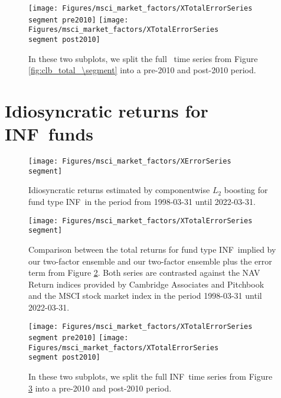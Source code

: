 \begin{figure}[H]
	\centering
	\texttt{[image: Figures/msci\_market\_factors/XTotalErrorSeries\\segment pre2010]}
	\texttt{[image: Figures/msci\_market\_factors/XTotalErrorSeries\\segment post2010]}
	\caption{
		In these two subplots, we split the full \segment \ time series from Figure \ref{fig:clb_total_\segment} into a pre-2010 and post-2010 period.
	}
	\label{fig:clb_pre_post_2010_\segment}
\end{figure}


\renewcommand{\segment}{INF}

\section{Idiosyncratic returns for \segment \ funds}
\label{sec:errors_\segment}

\begin{figure}[H]
	\centering
	\texttt{[image: Figures/msci\_market\_factors/XErrorSeries\\segment]}
	\caption{Idiosyncratic returns estimated by componentwise $L_2$ boosting for fund type \segment \ in the period from 1998-03-31 until 2022-03-31.}
	\label{fig:clb_idio_\segment}
\end{figure}

\begin{figure}[H]
	\centering
	\texttt{[image: Figures/msci\_market\_factors/XTotalErrorSeries\\segment]}
	\caption{
		Comparison between the total returns for fund type \segment \ implied by our two-factor ensemble and our two-factor ensemble plus the error term from Figure \ref{fig:clb_idio_\segment}.
		Both series are contrasted against the NAV Return indices provided by Cambridge Associates and Pitchbook and the MSCI stock market index in the period 1998-03-31 until 2022-03-31.
	}
	\label{fig:clb_total_\segment}
\end{figure}

\begin{figure}[H]
	\centering
	\texttt{[image: Figures/msci\_market\_factors/XTotalErrorSeries\\segment pre2010]}
	\texttt{[image: Figures/msci\_market\_factors/XTotalErrorSeries\\segment post2010]}
	\caption{
		In these two subplots, we split the full \segment \ time series from Figure \ref{fig:clb_total_\segment} into a pre-2010 and post-2010 period.
	}
	\label{fig:clb_pre_post_2010_\segment}
\end{figure}


\renewcommand{\segment}{NATRES}

